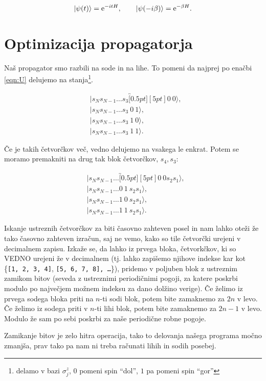 \documentclass[a4 paper, 12pt]{article}
\begin{document}
\[
	|\psi(t)\rangle = \text{e}^{-itH}, \qquad |\psi(-i\beta)\rangle = \text{e}^{-\beta H}.
\]

\section{Optimizacija propagatorja}

Naš propagator smo razbili na sode in na lihe. To pomeni da najprej po enačbi
\eqref{eqn:U} delujemo na stanja\footnote{delamo v bazi $\sigma_j^z$, $0$
pomeni spin "`dol"', $1$ pa pomeni spin "`gor"'}.

\begin{align*}
	&|s_N s_{N-1} \ldots s_3 \overbracket[0.5pt][5pt]{0\ 0}\rangle, \\
	&|s_N s_{N-1} \ldots s_3\ 0\ 1\rangle, \\
	&|s_N s_{N-1} \ldots s_3\ 1\ 0\rangle, \\
	&|s_N s_{N-1} \ldots s_3\ 1\ 1\rangle.
\end{align*}

Če je takih četvorčkov več, vedno delujemo na vsakega le enkrat. Potem se moramo premakniti na drug tak
blok četvorčkov, $s_4,s_3$:

\begin{align*}
	&|s_N s_{N-1} \ldots \overbracket[0.5pt][5pt]{0\ 0}s_2 s_1\rangle, \\
	&|s_N s_{N-1} \ldots 0\ 1\ s_2 s_1\rangle, \\
	&|s_N s_{N-1} \ldots 1\ 0\ s_2 s_1\rangle, \\
	&|s_N s_{N-1} \ldots 1\ 1\ s_2 s_1\rangle.
\end{align*}

Iskanje ustreznih četvorčkov za biti časovno zahteven posel in nam lahko oteži že tako časovno zahteven
izračun, saj ne vemo, kako so tile četvorčki urejeni v decimalnem zapisu. Izkaže se, da
lahko iz prvega bloka, četvorkčkov, ki so VEDNO urejeni že v decimalnem (tj. lahko
zapišemo njihove indekse kar kot \{{\tt [1, 2, 3, 4]}, {\tt [5, 6, 7, 8], \ldots}\}), pridemo v poljuben blok
z ustreznim zamikom bitov (seveda z ustreznimi periodičnimi pogoji, za katere poskrbi modulo po največjem možnem indeksu za dano dolžino verige). Če želimo
iz prvega sodega bloka priti na $n$-ti sodi blok, potem bite zamaknemo za $2n$ v levo. Če želimo iz sodega
priti v $n$-ti lihi blok, potem bite zamaknemo za $2n - 1$ v levo. Modulo že sam po sebi poskrbi za naše
periodične robne pogoje.

Zamikanje bitov je zelo hitra operacija, tako to delovanja našega programa močno zmanjša, prav tako pa nam
ni treba računati lihih in sodih posebej.
\end{document}
